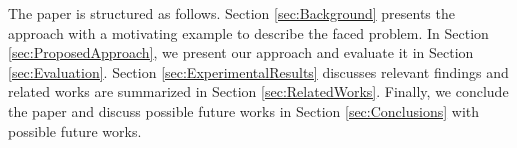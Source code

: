 The paper is structured as follows. Section \ref{sec:Background} presents the \MNB approach with a motivating example to describe the faced problem. In Section \ref{sec:ProposedApproach}, we present our approach and evaluate it in Section \ref{sec:Evaluation}. Section \ref{sec:ExperimentalResults} discusses relevant findings and related works are summarized in  Section \ref{sec:RelatedWorks}. Finally, we conclude the paper and discuss possible future works in Section \ref{sec:Conclusions} with possible future works.

